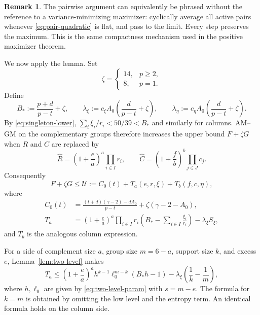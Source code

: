 \documentclass[11pt]{article}
\theoremstyle{definition}
\newtheorem{remark}[theorem]{Remark}
\newcommand{\g}{\gamma}
\newcommand{\cU}{\mathcal U}
\begin{document}
\begin{remark}\label{rem:two-level-rigour}
The pairwise argument can equivalently be phrased without the reference to a
variance-minimizing maximizer: cyclically average all active pairs whenever
\eqref{eq:pair-quadratic} is flat, and pass to the limit.  Every step preserves
the maximum.  This is the same compactness mechanism used in the positive
maximizer theorem.
\end{remark}

We now apply the lemma.  Set
\begin{equation}\label{eq:zeta}
 \zeta=
 \begin{cases}
 14,&p\ge2,\\
 8,&p=1.
 \end{cases}
\end{equation}
Define
\begin{equation}\label{eq:Bstar}
 B_*:=\frac{p+d}{p-t}+\zeta,
 \qquad
 \lambda_\xi:=c_\xi A_0\left(\frac d{p-t}+\zeta\right),
 \qquad
 \lambda_\eta:=c_\eta A_0\left(\frac d{p-t}+\zeta\right).
\end{equation}
By \eqref{eq:singleton-lower},
\(
 \sum_i\xi_i/r_i<50/39<B_*
\)
and similarly for columns.  AM--GM on the complementary groups therefore
increases the upper bound $F+\zeta G$ when $R$ and $C$ are replaced by
\[
 \widehat R=\left(1+\frac ea\right)^a\prod_{i\in I}r_i,
 \qquad
 \widehat C=\left(1+\frac fb\right)^b\prod_{j\in J}c_j.
\]
Consequently
\begin{equation}\label{eq:dual-upper}
 F+\zeta G\le \cU
 :=C_0(t)+T_a(e,r,\xi)+T_b(f,c,\eta),
\end{equation}
where
\begin{align}
 C_0(t)&=
 \frac{(t+d)(\g-2)-dA_0}{p-t}
 +\zeta(\g-2-A_0),
 \label{eq:C0}\\
 T_a&=
 \left(1+\frac ea\right)^a\prod_{i\in I}r_i
 \left(B_*-\sum_{i\in I}\frac{\xi_i}{r_i}\right)
 -\lambda_\xi S_\xi,
 \label{eq:Ta}
\end{align}
and $T_b$ is the analogous column expression.

For a side of complement size $a$, group size $m=6-a$, support size $k$,
and excess $e$, Lemma~\ref{lem:two-level} makes
\begin{equation}\label{eq:Tcandidate}
 T_a\le
 \left(1+\frac ea\right)^a h^{k-1}\ell_0^{m-k}(B_*h-1)
 -\lambda_\xi\left(\frac1k-\frac1m\right),
\end{equation}
where $h,\ell_0$ are given by \eqref{eq:two-level-param} with
$s=m-e$.  The formula for $k=m$ is obtained by omitting the low level and
the entropy term.  An identical formula holds on the column side.
\end{document}
